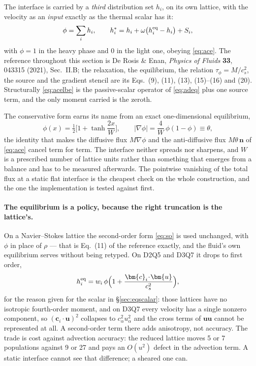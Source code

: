 \documentclass[11pt,a4paper]{article}
\newcommand{\cs}{c_s}
\newcommand{\ci}{\bm{c}_i}
\newcommand{\uu}{\bm{u}}
\newcommand{\nn}{\bm{n}}
\begin{document}
The interface is carried by a \emph{third} distribution set $h_i$, on its own
lattice, with the velocity as an \emph{input} exactly as the thermal scalar has
it:
\begin{equation}
  \phi = \sum_i h_i, \qquad
  h_i^\ast = h_i + \omega\big(h_i^{\rm eq} - h_i\big) + S_i ,
  \label{eq:acelbe}
\end{equation}
with $\phi=1$ in the heavy phase and $0$ in the light one, obeying \eqref{eq:ace}.
The reference throughout this section is De Rosis \& Enan, \emph{Physics of
Fluids} \textbf{33}, 043315 (2021), Sec.~II.B; the relaxation, the equilibrium,
the relation $\tau_\phi = M/\cs^2$, the source and the gradient stencil are its
Eqs.~(9), (11), (13), (15)--(16) and (20). Structurally \eqref{eq:acelbe} is the
passive-scalar operator of \eqref{eq:adeq} plus one source term, and the only
moment carried is the zeroth.

The conservative form earns its name from an exact one-dimensional equilibrium,
\begin{equation}
  \phi(x) = \tfrac12\Big[1+\tanh\frac{2x}{W}\Big],
  \qquad
  |\nabla\phi| = \frac{4}{W}\,\phi(1-\phi) \equiv \theta ,
  \label{eq:tanh}
\end{equation}
the identity that makes the diffusive flux $M\nabla\phi$ and the anti-diffusive
flux $M\theta\,\nn$ of \eqref{eq:ace} cancel term for term. The interface neither
spreads nor sharpens, and $W$ is a prescribed number of lattice units rather
than something that emerges from a balance and has to be measured afterwards.
The pointwise vanishing of the total flux at a static flat interface is the
cheapest check on the whole construction, and the one the implementation is
tested against first.

\paragraph{The equilibrium is a policy, because the right truncation is the
lattice's.} On a Navier--Stokes lattice the second-order form \eqref{eq:so} is
used unchanged, with $\phi$ in place of $\rho$ --- that is Eq.~(11) of the
reference exactly, and the fluid's own equilibrium serves without being
retyped. On D2Q5 and D3Q7 it drops to first order,
\begin{equation}
  h_i^{\rm eq} = w_i\,\phi\Big(1+\frac{\ci\!\cdot\!\uu}{\cs^2}\Big),
\end{equation}
for the reason given for the scalar in \S\ref{sec:eqscalar}: those lattices have
no isotropic fourth-order moment, and on D3Q7 every velocity has a single
nonzero component, so $(\ci\!\cdot\!\uu)^2$ collapses to $c_\alpha^2u_\alpha^2$
and the cross terms of $\uu\uu$ cannot be represented at all. A second-order
term there adds anisotropy, not accuracy. The trade is cost against advection
accuracy: the reduced lattice moves 5 or 7 populations against 9 or 27 and pays
an $O(u^2)$ defect in the advection term. A static interface cannot see that
difference; a sheared one can.
\end{document}

